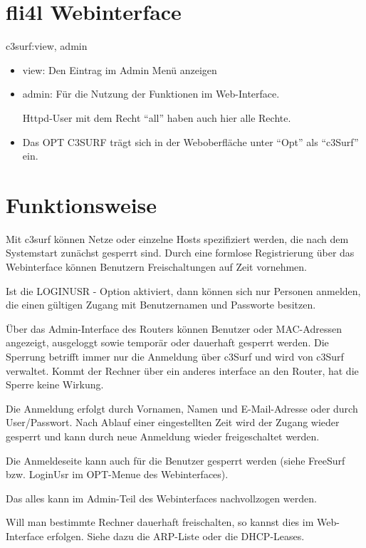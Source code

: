 \section {fli4l Webinterface}

c3surf:view, admin
\begin{itemize}
    \item view: Den Eintrag im Admin Menü anzeigen
    \item admin: Für die Nutzung der Funktionen im Web-Interface.

    Httpd-User mit dem Recht ``all'' haben auch hier alle Rechte.

    \item Das OPT C3SURF trägt sich in der Weboberfläche unter ``Opt'' als ``c3Surf'' ein.
\end{itemize}


\section {Funktionsweise}

Mit c3surf können Netze oder einzelne Hosts spezifiziert werden, die nach
dem Systemstart zunächst gesperrt sind. Durch eine formlose Registrierung
über das Webinterface können Benutzern Freischaltungen auf Zeit vornehmen.
\parskip 12pt

Ist die LOGINUSR - Option aktiviert, dann können sich nur Personen anmelden,
die einen gültigen Zugang mit Benutzernamen und Passworte besitzen.
\parskip 12pt

Über das Admin-Interface des Routers können Benutzer oder MAC-Adressen angezeigt,
ausgeloggt sowie temporär oder dauerhaft gesperrt werden. Die Sperrung betrifft
immer nur die Anmeldung über c3Surf und wird von c3Surf verwaltet. Kommt der
Rechner über ein anderes interface an den Router, hat die Sperre keine Wirkung.
\parskip 12pt

Die Anmeldung erfolgt durch Vornamen, Namen und E-Mail-Adresse oder durch
User/Passwort. Nach Ablauf einer eingestellten Zeit wird der Zugang wieder
gesperrt und kann durch neue Anmeldung wieder freigeschaltet werden.
\parskip 12pt

Die Anmeldeseite kann auch für die Benutzer gesperrt werden (siehe FreeSurf bzw.
LoginUsr im OPT-Menue des Webinterfaces).
\parskip 12pt

Das alles kann im Admin-Teil des Webinterfaces nachvollzogen werden.
\parskip 12pt

Will man bestimmte Rechner dauerhaft freischalten, so kannst dies im
Web-Interface erfolgen. Siehe dazu die ARP-Liste oder die DHCP-Leases.
\parskip 12pt


